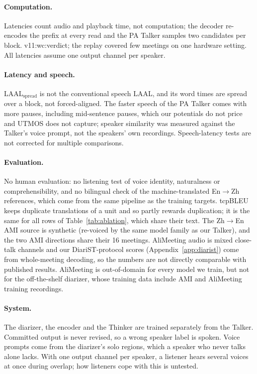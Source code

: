 \paragraph{Computation.} Latencies count audio and playback time, not computation; the decoder re-encodes the prefix
at every read and the PA Talker samples two candidates per block.\ifWallclock{} \num{v11:wc:verdict}; the replay
covered few meetings on one hardware setting.\fi{} All latencies assume one output channel per speaker.

\paragraph{Latency and speech.} LAAL$_\text{spread}$ is not the conventional speech LAAL, and its word times are spread
over a block, not forced-aligned. The faster speech of the PA Talker comes with more pauses, including mid-sentence
pauses, which our potentials do not price and UTMOS does not capture; speaker similarity was measured against the
Talker's voice prompt, not the speakers' own recordings. Speech-latency tests are not corrected for multiple
comparisons.

\paragraph{Evaluation.} No human evaluation: no listening test of voice identity, naturalness or comprehensibility,
and no bilingual check of the machine-translated En$\rightarrow$Zh references, which come from the same pipeline as the
training targets. tcpBLEU keeps duplicate translations of a unit and so partly rewards duplication; it is the same for
all rows of Table~\ref{tab:ablation}, which share their text. The Zh$\rightarrow$En AMI source is synthetic (re-voiced by
the same model family as our Talker), and the two AMI directions share their 16 meetings. AliMeeting audio is mixed
close-talk channels and our DiariST-protocol scores (Appendix~\ref{app:diarist}) come from whole-meeting decoding, so
the numbers are not directly comparable with published results. AliMeeting is out-of-domain for every model we train,
but not for the off-the-shelf diarizer, whose training data include AMI and AliMeeting training recordings.

\paragraph{System.} The diarizer, the encoder and the Thinker are trained separately from the Talker. Committed output
is never revised, so a wrong speaker label is spoken. Voice prompts come from the diarizer's solo regions, which a
speaker who never talks alone lacks. With one output channel per speaker, a listener hears several voices at once
during overlap; how listeners cope with this is untested.

